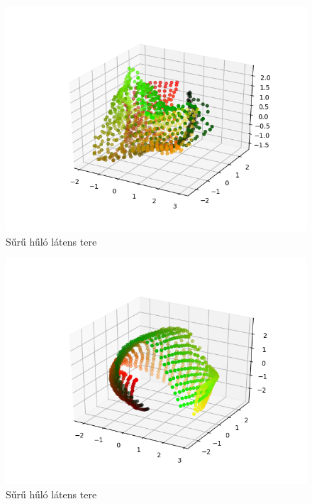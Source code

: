 \begin{figure}[h!]
\begin{center}
  
  \includegraphics[width=\linewidth]{metrics/3D-dense.png}
  \caption{Sűrű hűló látens tere}\label{3D-dense}
\end{center}
\end{figure}

\begin{figure}[h!]
\begin{center}
  
  \includegraphics[width=\linewidth]{metrics/3D-epoch18.png}
  \caption{Sűrű hűló látens tere}\label{3D-conv}
\end{center}
\end{figure}

